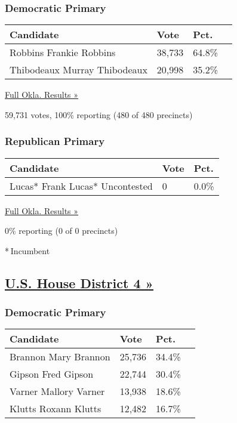 \hypertarget{democratic-primary-3}{%
\subsubsection{Democratic Primary}\label{democratic-primary-3}}

\begin{longtable}[]{@{}llll@{}}
\toprule
Candidate & Vote & Pct. &\tabularnewline
\midrule
\endhead
 Robbins Frankie Robbins & 38,733 & 64.8\% &\tabularnewline
 Thibodeaux Murray Thibodeaux & 20,998 & 35.2\% &\tabularnewline
\bottomrule
\end{longtable}

\href{https://www.nytimes3xbfgragh.onion/elections/results/oklahoma}{Full
Okla. Results »}

59,731 votes, 100\% reporting (480 of 480 precincts)

\hypertarget{republican-primary-3}{%
\subsubsection{Republican Primary}\label{republican-primary-3}}

\begin{longtable}[]{@{}lll@{}}
\toprule
Candidate & Vote & Pct.\tabularnewline
\midrule
\endhead
 Lucas* Frank Lucas* Uncontested & 0 & 0.0\%\tabularnewline
\bottomrule
\end{longtable}

\href{https://www.nytimes3xbfgragh.onion/elections/results/oklahoma}{Full
Okla. Results »}

0\% reporting (0 of 0 precincts)

* Incumbent

\hypertarget{us-house-district-4-}{%
\subsection{\texorpdfstring{\href{https://www.nytimes3xbfgragh.onion/elections/results/oklahoma-house-district-4-primary-election}{U.S.
House District 4
»}}{U.S. House District 4 »}}\label{us-house-district-4-}}

\hypertarget{democratic-primary-4}{%
\subsubsection{Democratic Primary}\label{democratic-primary-4}}

\begin{longtable}[]{@{}llll@{}}
\toprule
Candidate & Vote & Pct. &\tabularnewline
\midrule
\endhead
 Brannon Mary Brannon & 25,736 & 34.4\% &\tabularnewline
 Gipson Fred Gipson & 22,744 & 30.4\% &\tabularnewline
 Varner Mallory Varner & 13,938 & 18.6\% &\tabularnewline
 Klutts Roxann Klutts & 12,482 & 16.7\% &\tabularnewline
\bottomrule
\end{longtable}

